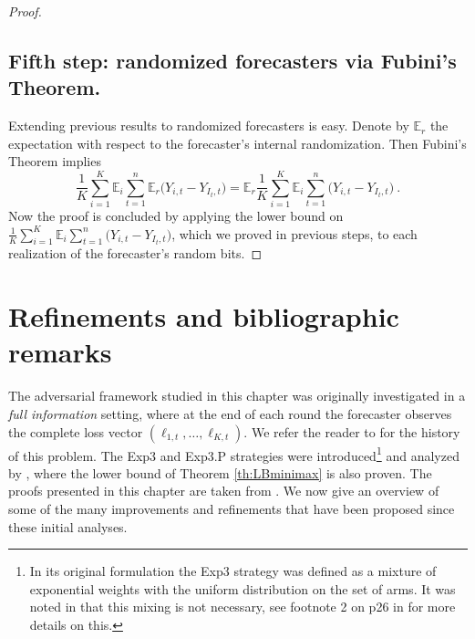 \documentclass[11pt]{hackednow}
\newcommand{\E}{\mathbb{E}}
\begin{document}
\begin{proof}
\subsection*{Fifth step: randomized forecasters via Fubini's Theorem.}
Extending previous results to randomized forecasters is easy. Denote by $\E_r$ the expectation with respect to the forecaster's internal randomization. Then Fubini's Theorem implies
$$
\frac{1}{K} \sum_{i=1}^K \E_i\sum_{t=1}^n \E_r\bigl(Y_{i,t} - Y_{I_t,t}\bigr) = \E_r \frac{1}{K} \sum_{i=1}^K \E_i \sum_{t=1}^n \bigl(Y_{i,t} - Y_{I_t,t}\bigr)~.$$
Now the proof is concluded by applying the lower bound on $\tfrac{1}{K} \sum_{i=1}^K \E_i \sum_{t=1}^n \bigl(Y_{i,t} - Y_{I_t,t}\bigr)$, which we proved in previous steps, to each realization of the forecaster's random bits.
\end{proof}

\section{Refinements and bibliographic remarks}
The adversarial framework studied in this chapter was originally investigated in a {\em full information} setting, where at the end of each round the forecaster observes the complete loss vector $(\ell_{1,t}, \hdots, \ell_{K,t})$. We refer the reader to \cite{CL06} for the history of this problem. The Exp3 and Exp3.P strategies were introduced\footnote{In its original formulation the Exp3 strategy was defined as a mixture of exponential weights with the uniform distribution on the set of arms. It was noted in \cite{Sto05} that this mixing is not necessary, see footnote 2 on p26 in \cite{Bub10} for more details on this.} and analyzed by \cite{ACFS03}, where the lower bound of Theorem \ref{th:LBminimax} is also proven. The proofs presented in this chapter are taken from \cite{Bub10}. We now give an overview of some of the many improvements and refinements that have been proposed since these initial analyses.
\end{document}
